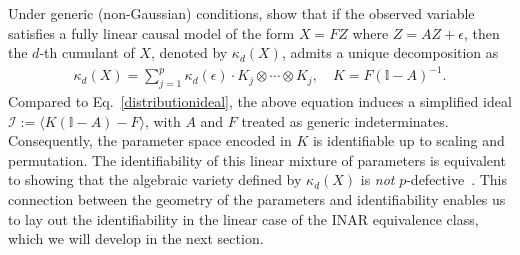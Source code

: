 \documentclass[10pt]{article}
\numberwithin{figure}{section}
\begin{document}
Under generic (non-Gaussian) conditions, \citet{carreno2024linear} show that if the observed variable satisfies a fully linear causal model of the form $X = FZ$ where $  Z = AZ + \epsilon$, then the $d$-th cumulant of $X$, denoted by $\kappa_d(X)$, admits a unique decomposition as
\begin{align*}
\kappa_d(X) = \sum_{j=1}^{p}\kappa_d(\epsilon) \cdot K_{j} \otimes \cdots \otimes K_{j},\quad K = F(\mathbb{I}-A)^{-1}.
\end{align*}
Compared to Eq.~\eqref{distributionideal}, the above equation induces a simplified ideal $\mathcal{I} := \langle K(\mathbb{I}-A) - F \rangle$, with $A$ and $F$ treated as generic indeterminates. Consequently, the parameter space encoded in $K$ is identifiable up to scaling and permutation. The identifiability of this linear mixture of parameters is equivalent to showing that the algebraic variety defined by $\kappa_d(X)$ is \emph{not} $p$-defective~\citep{chiantini2017generic}. This connection between the geometry of the parameters and identifiability enables us to lay out the identifiability in the linear case of the INAR equivalence class, which we will develop in the next section.
\end{document}
